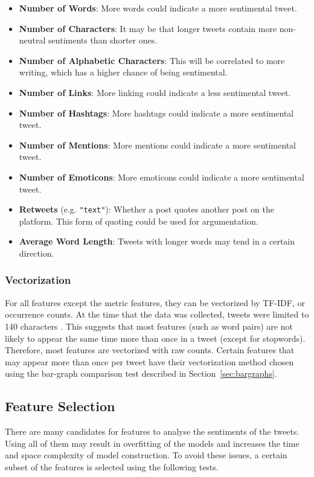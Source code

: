\documentclass[11pt]{article}
\begin{document}
\begin{itemize}
	\item \textbf{Number of Words}: More words could indicate a more sentimental tweet.
	\item \textbf{Number of Characters}: It may be that longer tweets contain more non-neutral sentiments than shorter ones.
	\item \textbf{Number of Alphabetic Characters}: This will be correlated to more writing, which has a higher chance of being sentimental.
	\item \textbf{Number of Links}: More linking could indicate a less sentimental tweet.
	\item \textbf{Number of Hashtags}: More hashtags could indicate a more sentimental tweet.
	\item \textbf{Number of Mentions}: More mentions could indicate a more sentimental tweet.
	\item \textbf{Number of Emoticons}: More emoticons could indicate a more sentimental tweet.
	\item \textbf{Retweets} (e.g. \texttt {"text"}): Whether a post quotes another post on the platform. This form of quoting could be used for argumentation.
	\item \textbf{Average Word Length}: Tweets with longer words may tend in a certain direction.
\end{itemize}

\subsubsection{Vectorization}

For all features except the metric features, they can be vectorized by TF-IDF, or occurrence counts.
At the time that the data was collected, tweets were limited to 140 characters \cite{tweetlen}.
This suggests that most features (such as word pairs) are not likely to appear the same time more than once in a tweet (except for stopwords).
Therefore, most features are vectorized with raw counts. 
Certain features that may appear more than once per tweet have their vectorization method chosen using the bar-graph comparison test described in Section~\ref{sec:bargraphs}.

\subsection{Feature Selection}

There are many candidates for features to analyse the sentiments of the tweets.
Using all of them may result in overfitting of the models and increases the time and space complexity of model construction.
To avoid these issues, a certain subset of the features is selected using the following tests.
\end{document}
